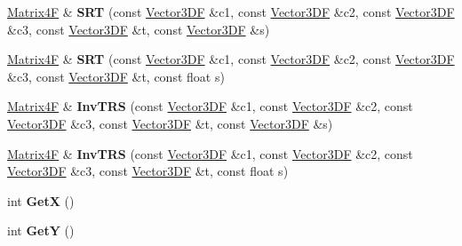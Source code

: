 \begin{DoxyCompactItemize}
\item 
\hypertarget{class_matrix4_f_abef3bb8fe2931d54d6a56adb109fa660}{\hyperlink{class_matrix4_f}{Matrix4\+F} \& {\bfseries S\+R\+T} (const \hyperlink{class_vector3_d_f}{Vector3\+D\+F} \&c1, const \hyperlink{class_vector3_d_f}{Vector3\+D\+F} \&c2, const \hyperlink{class_vector3_d_f}{Vector3\+D\+F} \&c3, const \hyperlink{class_vector3_d_f}{Vector3\+D\+F} \&t, const \hyperlink{class_vector3_d_f}{Vector3\+D\+F} \&s)}\label{class_matrix4_f_abef3bb8fe2931d54d6a56adb109fa660}

\item 
\hypertarget{class_matrix4_f_a1dc9671283d1221a4123eadf93173b41}{\hyperlink{class_matrix4_f}{Matrix4\+F} \& {\bfseries S\+R\+T} (const \hyperlink{class_vector3_d_f}{Vector3\+D\+F} \&c1, const \hyperlink{class_vector3_d_f}{Vector3\+D\+F} \&c2, const \hyperlink{class_vector3_d_f}{Vector3\+D\+F} \&c3, const \hyperlink{class_vector3_d_f}{Vector3\+D\+F} \&t, const float s)}\label{class_matrix4_f_a1dc9671283d1221a4123eadf93173b41}

\item 
\hypertarget{class_matrix4_f_a7e7553777fa8f493ac68bc8b8fef108c}{\hyperlink{class_matrix4_f}{Matrix4\+F} \& {\bfseries Inv\+T\+R\+S} (const \hyperlink{class_vector3_d_f}{Vector3\+D\+F} \&c1, const \hyperlink{class_vector3_d_f}{Vector3\+D\+F} \&c2, const \hyperlink{class_vector3_d_f}{Vector3\+D\+F} \&c3, const \hyperlink{class_vector3_d_f}{Vector3\+D\+F} \&t, const \hyperlink{class_vector3_d_f}{Vector3\+D\+F} \&s)}\label{class_matrix4_f_a7e7553777fa8f493ac68bc8b8fef108c}

\item 
\hypertarget{class_matrix4_f_a8f2399c739386a9e9c2b45196a9547c0}{\hyperlink{class_matrix4_f}{Matrix4\+F} \& {\bfseries Inv\+T\+R\+S} (const \hyperlink{class_vector3_d_f}{Vector3\+D\+F} \&c1, const \hyperlink{class_vector3_d_f}{Vector3\+D\+F} \&c2, const \hyperlink{class_vector3_d_f}{Vector3\+D\+F} \&c3, const \hyperlink{class_vector3_d_f}{Vector3\+D\+F} \&t, const float s)}\label{class_matrix4_f_a8f2399c739386a9e9c2b45196a9547c0}

\item 
\hypertarget{class_matrix4_f_a2104d83b12bcfff371a411b02446715f}{int {\bfseries Get\+X} ()}\label{class_matrix4_f_a2104d83b12bcfff371a411b02446715f}

\item 
\hypertarget{class_matrix4_f_a7b52baa11d5650a7d4c5e3cf7fa69478}{int {\bfseries Get\+Y} ()}\label{class_matrix4_f_a7b52baa11d5650a7d4c5e3cf7fa69478}


\end{DoxyCompactItemize}
